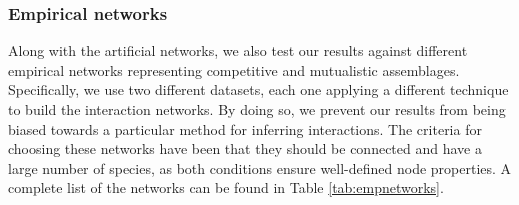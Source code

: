  
\subsubsection{Empirical networks}
Along with the artificial networks, we also test our results against different empirical networks representing competitive and mutualistic assemblages. Specifically, we use two different datasets, each one applying a different technique to build the interaction networks. By doing so,  we prevent our results from being biased towards a particular method for inferring interactions. The criteria for choosing these networks have been that they should be connected and have a large number of species, as both conditions ensure well-defined node properties. A complete list of the networks can be found in  Table \ref{tab:empnetworks}. 

